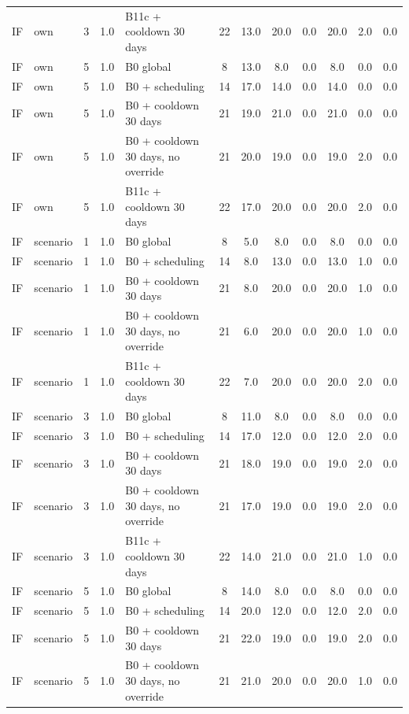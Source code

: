\begin{longtable}{lllllccccccc}
IF & own & 3 & 1.0 & B11c + cooldown 30 days & 22 & 13.0 & 20.0 & 0.0 & 20.0 & 2.0 & 0.0 \\
IF & own & 5 & 1.0 & B0 global & 8 & 13.0 & 8.0 & 0.0 & 8.0 & 0.0 & 0.0 \\
IF & own & 5 & 1.0 & B0 + scheduling & 14 & 17.0 & 14.0 & 0.0 & 14.0 & 0.0 & 0.0 \\
IF & own & 5 & 1.0 & B0 + cooldown 30 days & 21 & 19.0 & 21.0 & 0.0 & 21.0 & 0.0 & 0.0 \\
IF & own & 5 & 1.0 & B0 + cooldown 30 days, no override & 21 & 20.0 & 19.0 & 0.0 & 19.0 & 2.0 & 0.0 \\
IF & own & 5 & 1.0 & B11c + cooldown 30 days & 22 & 17.0 & 20.0 & 0.0 & 20.0 & 2.0 & 0.0 \\
IF & scenario & 1 & 1.0 & B0 global & 8 & 5.0 & 8.0 & 0.0 & 8.0 & 0.0 & 0.0 \\
IF & scenario & 1 & 1.0 & B0 + scheduling & 14 & 8.0 & 13.0 & 0.0 & 13.0 & 1.0 & 0.0 \\
IF & scenario & 1 & 1.0 & B0 + cooldown 30 days & 21 & 8.0 & 20.0 & 0.0 & 20.0 & 1.0 & 0.0 \\
IF & scenario & 1 & 1.0 & B0 + cooldown 30 days, no override & 21 & 6.0 & 20.0 & 0.0 & 20.0 & 1.0 & 0.0 \\
IF & scenario & 1 & 1.0 & B11c + cooldown 30 days & 22 & 7.0 & 20.0 & 0.0 & 20.0 & 2.0 & 0.0 \\
IF & scenario & 3 & 1.0 & B0 global & 8 & 11.0 & 8.0 & 0.0 & 8.0 & 0.0 & 0.0 \\
IF & scenario & 3 & 1.0 & B0 + scheduling & 14 & 17.0 & 12.0 & 0.0 & 12.0 & 2.0 & 0.0 \\
IF & scenario & 3 & 1.0 & B0 + cooldown 30 days & 21 & 18.0 & 19.0 & 0.0 & 19.0 & 2.0 & 0.0 \\
IF & scenario & 3 & 1.0 & B0 + cooldown 30 days, no override & 21 & 17.0 & 19.0 & 0.0 & 19.0 & 2.0 & 0.0 \\
IF & scenario & 3 & 1.0 & B11c + cooldown 30 days & 22 & 14.0 & 21.0 & 0.0 & 21.0 & 1.0 & 0.0 \\
IF & scenario & 5 & 1.0 & B0 global & 8 & 14.0 & 8.0 & 0.0 & 8.0 & 0.0 & 0.0 \\
IF & scenario & 5 & 1.0 & B0 + scheduling & 14 & 20.0 & 12.0 & 0.0 & 12.0 & 2.0 & 0.0 \\
IF & scenario & 5 & 1.0 & B0 + cooldown 30 days & 21 & 22.0 & 19.0 & 0.0 & 19.0 & 2.0 & 0.0 \\
IF & scenario & 5 & 1.0 & B0 + cooldown 30 days, no override & 21 & 21.0 & 20.0 & 0.0 & 20.0 & 1.0 & 0.0 \\

\end{longtable}
